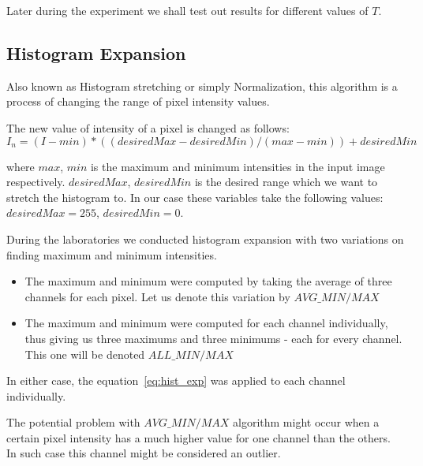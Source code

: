 \documentclass{article}
\begin{document}
Later during the experiment we shall test out results for different values of $T$.

\subsection{Histogram Expansion}
Also known as Histogram stretching or simply Normalization, this algorithm is a process of changing the range of pixel intensity values.

The new value of intensity of a pixel is changed as follows:
\begin{equation}
\label{eq:hist_exp}
 I_n = (I - min) * ((desiredMax - desiredMin) / (max - min)) + desiredMin
\end{equation}

where $max$, $min$ is the maximum and minimum intensities in the input image respectively.
$desiredMax$, $desiredMin$ is the desired range which we want to stretch the histogram to. In our case these variables take the following values:\\
$desiredMax = 255$, $desiredMin = 0$.

During the laboratories we conducted histogram expansion with two variations on finding maximum and minimum intensities.

\begin{itemize}
	\item The maximum and minimum were computed by taking the average of three channels for each pixel. Let us denote this variation by $AVG\_MIN/MAX$
	\item The maximum and minimum were computed for each channel individually, thus giving us three maximums and three minimums - each for every channel. This one will be denoted $ALL\_MIN/MAX$
\end{itemize}

In either case, the equation~\ref{eq:hist_exp} was applied to each channel individually.

The potential problem with $AVG\_MIN/MAX$ algorithm might occur when a certain pixel intensity has a much higher value for one channel than the others. In such case this channel might be considered an outlier.

\end{document}

